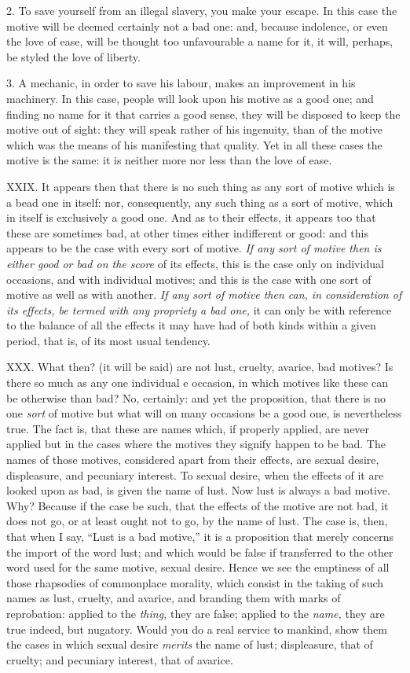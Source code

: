 \documentclass[12pt]{report}
\begin{document}
2. To save yourself from an illegal slavery, you make your escape. In
this case the motive will be deemed certainly not a bad one: and,
because indolence, or even the love of ease, will be thought too
unfavourable a name for it, it will, perhaps, be styled the love of
liberty.

3. A mechanic, in order to save his labour, makes an improvement in his
machinery. In this case, people will look upon his motive as a good one;
and finding no name for it that carries a good sense, they will be
disposed to keep the motive out of sight: they will speak rather of his
ingenuity, than of the motive which was the means of his manifesting
that quality. Yet in all these cases the motive is the same: it is
neither more nor less than the love of ease.

XXIX. It appears then that there is no such thing as any sort of motive
which is a bead one in itself: nor, consequently, any such thing as a
sort of motive, which in itself is exclusively a good one. And as to
their effects, it appears too that these are sometimes bad, at other
times either indifferent or good: and this appears to be the case with
every sort of motive. \emph{If any sort of motive then is either good or
bad on the score} of its effects, this is the case only on individual
occasions, and with individual motives; and this is the case with one
sort of motive as well as with another. \emph{If any sort of motive then
can, in consideration of its effects, be termed with any propriety a bad
one,} it can only be with reference to the balance of all the effects it
may have had of both kinds within a given period, that is, of its most
usual tendency.

XXX. What then? (it will be said) are not lust, cruelty, avarice, bad
motives? Is there so much as any one individual e occasion, in which
motives like these can be otherwise than bad? No, certainly: and yet the
proposition, that there is no one \emph{sort} of motive but what will on
many occasions be a good one, is nevertheless true. The fact is, that
these are names which, if properly applied, are never applied but in the
cases where the motives they signify happen to be bad. The names of
those motives, considered apart from their effects, are sexual desire,
displeasure, and pecuniary interest. To sexual desire, when the effects
of it are looked upon as bad, is given the name of lust. Now lust is
always a bad motive. Why? Because if the case be such, that the effects
of the motive are not bad, it does not go, or at least ought not to go,
by the name of lust. The case is, then, that when I say, ``Lust is a bad
motive,'' it is a proposition that merely concerns the import of the
word lust; and which would be false if transferred to the other word
used for the same motive, sexual desire. Hence we see the emptiness of
all those rhapsodies of commonplace morality, which consist in the
taking of such names as lust, cruelty, and avarice, and branding them
with marks of reprobation: applied to the \emph{thing,} they are false;
applied to the \emph{name,} they are true indeed, but nugatory. Would
you do a real service to mankind, show them the cases in which sexual
desire \emph{merits} the name of lust; displeasure, that of cruelty; and
pecuniary interest, that of avarice.
\end{document}
